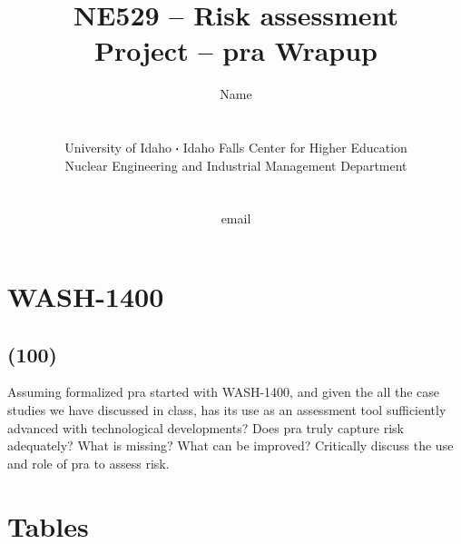 \documentclass[11pt,a4paper]{article}
\makeatletter
\newcommand*\sq{\mathbin{\vcenter{\hbox{\rule{.3ex}{.3ex}}}}} %
\newcommand{\acs}{\acrshort} %
\renewcommand\listoftables{%
    \@starttoc{lot}%
}
\makeatother
\begin{document}
\begin{titlepage}
    \title{
        NE529 -- Risk assessment\\
        Project  -- \acs{pra} Wrapup\\
    }
    \author{
        Name
        \\ \\ \\
        University of Idaho $\sq$ Idaho Falls Center for Higher Education\\
        Nuclear Engineering and Industrial Management Department
        \\ \\ \\
        email 
    }
\clearpage %
\maketitle
\vspace*{\fill}
\thispagestyle{empty} %
\end{titlepage}


\section{WASH-1400}
\subsection*{(100)}
Assuming formalized \acs{pra} started with WASH-1400, and given the all the case studies we have discussed in class, has its use as an assessment tool sufficiently advanced with technological developments? Does \acs{pra} truly capture risk adequately? What is missing? What can be improved? Critically discuss the use and role of \acs{pra} to assess risk.





\newpage


\section*{Tables}

{%
\let\oldnumberline\numberline%
\renewcommand{\numberline}{\tablename~\oldnumberline}%
\listoftables%
}

\newpage

\end{document}
